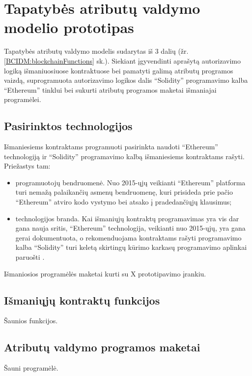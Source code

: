 \section{Tapatybės atributų valdymo modelio prototipas}

Tapatybės atributų valdymo modelis sudarytas iš 3 dalių (žr. \hypertarget{BCIDM:blockchainFunctions}{\ref{BCIDM:blockchainFunctions}} sk.). Siekiant įgyvendinti
aprašytą autorizavimo logiką išmaniuosiuose kontraktuose bei pamatyti galimą atributų programos vaizdą, suprogramuota autorizavimo
logikos dalis \enquote{Solidity} programavimo kalba \enquote{Ethereum} tinklui bei sukurti atributų programos maketai išmaniajai programėlei.

\subsection{Pasirinktos technologijos}

Išmaniesiems kontraktams programuoti pasirinkta naudoti \enquote{Ethereum} technologiją ir \enquote{Solidity} programavimo
kalbą išmaniesiems kontraktams rašyti. Priežastys tam:

\begin{itemize}
    \item programuotojų bendruomenė. Nuo 2015-ųjų veikianti \enquote{Ethereum} platforma turi nemažą
    palaikančių asmenų bendruomenę, kuri prisideda prie pačio \enquote{Ethereum} atviro kodo vystymo
    bei atsako į pradedančiųjų klausimus;
    \item technologijos branda. Kai išmaniųjų kontraktų programavimas yra vis dar gana nauja sritis,
    \enquote{Ethereum} technologija, veikianti nuo 2015-ųjų, yra gana gerai dokumentuota, o rekomenduojama kontraktams rašyti programavimo kalba
    \enquote{Solidity} \cite{Ethereum} turi keletą skirtingų kūrimo karkasų programavimo aplinkai paruošti \cite{SolidityDocumentation}.
\end{itemize}

Išmaniosios programėlės maketai kurti su X prototipavimo įrankiu.

\subsection{Išmaniųjų kontraktų funkcijos}

Šaunios funkcijos.

\subsection{Atributų valdymo programos maketai}

Šauni programėlė.
